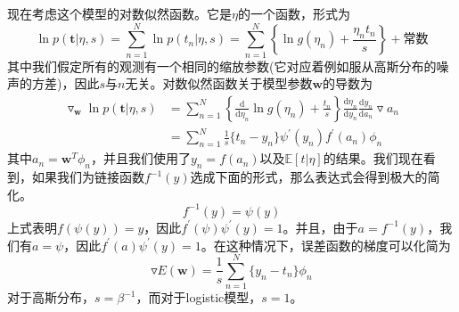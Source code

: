 现在考虑这个模型的对数似然函数。它是$\eta$的一个函数，形式为
\begin{equation}
	\ln p(\boldsymbol{t}|\eta,s)=\sum_{n=1}^{N}\ln p(t_n|\eta,s)=\sum_{n=1}^{N}\left\{\ln g(\eta_n)+\frac{\eta_nt_n}{s} \right\}+\text{常数}
\end{equation}
其中我们假定所有的观测有一个相同的缩放参数(它对应着例如服从高斯分布的噪声的方差)，因此$s$与$n$无关。对数似然函数关于模型参数$\boldsymbol{w}$的导数为
\begin{equation}
	\begin{aligned}
		\triangledown_{\boldsymbol{w}}\ln p(\boldsymbol{t}|\eta,s)&=\sum_{n=1}^{N}\left\{\frac{\mathrm{d}}{\mathrm{d}\eta_n}\ln g(\eta_n)+\frac{t_n}{s} \right\}\frac{\mathrm{d}\eta_n}{\mathrm{d}y_n}\frac{\mathrm{d}y_n}{\mathrm{d}a_n}\triangledown a_n\\
		&=\sum_{n=1}^{N}\frac{1}{s}\{t_n-y_n \}\psi^{'}(y_n)f^{'}(a_n)\phi_n
	\end{aligned}
\end{equation}
其中$a_n=\boldsymbol{w}^T\phi_n$，并且我们使用了$y_n=f(a_n)$以及$\mathbb{E}[t|\eta]$的结果。我们现在看到，如果我们为链接函数$f^{-1}(y)$选成下面的形式，那么表达式会得到极大的简化。
\begin{equation}
	f^{-1}(y)=\psi(y)
\end{equation}
上式表明$f(\psi(y))=y$，因此$f^{'}(\psi)\psi^{'}(y)=1$。并且，由于$a=f^{-1}(y)$，我们有$a=\psi$，因此$f^{'}(a)\psi^{'}(y)=1$。在这种情况下，误差函数的梯度可以化简为
\begin{equation}
	\triangledown E(\boldsymbol{w})=\frac{1}{s}\sum_{n=1}^{N}\{y_n-t_n \}\phi_n
\end{equation}
对于高斯分布，$s=\beta^{-1}$，而对于logistic模型，$s=1$。
